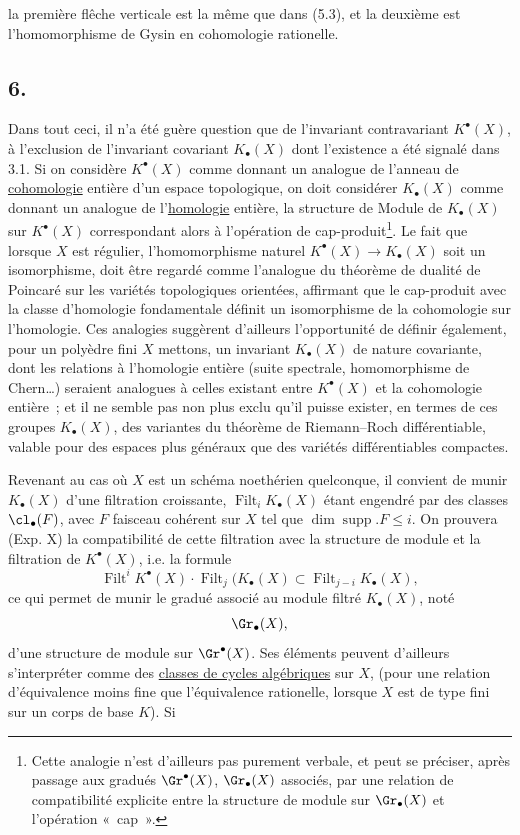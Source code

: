 la
premi\`ere fl\^eche verticale est la m\^eme que dans (5.3), et la deuxi\`eme est l'homomorphisme de Gysin en cohomologie rationelle.

\subsection*{6.}
Dans tout ceci, il n'a \'et\'e gu\`ere question que de l'invariant contravariant $K^\bullet(X)$, \`a l'exclusion de l'invariant covariant $K_\bullet(X)$ dont l'existence a \'et\'e signal\'e dans 3.1. Si on consid\`ere $K^\bullet(X)$ comme donnant un analogue de l'anneau de \underline{cohomologie} enti\`ere d'un espace topologique, on doit consid\'erer $K_\bullet(X)$ comme donnant un analogue de l'\underline{homologie} enti\`ere, la structure de Module de $K_\bullet(X)$ sur $K^\bullet(X)$ correspondant alors \`a l'op\'eration de cap-produit\footnote{Cette analogie n'est d'ailleurs pas purement verbale, et peut se pr\'eciser, apr\`es passage aux gradu\'es $\Gr^\bullet(X)$, $\Gr_\bullet(X)$ associ\'es, par une relation de compatibilit\'e explicite entre la structure de module sur $\Gr_\bullet(X)$ et l'op\'eration «~cap~».}. Le fait que lorsque $X$ est r\'egulier, l'homomorphisme naturel $K^\bullet(X)\to K_\bullet(X)$ soit un isomorphisme, doit \^etre regard\'e comme l'analogue du th\'eor\`eme de dualit\'e de Poincar\'e sur les vari\'et\'es topologiques orient\'ees, affirmant que le cap-produit avec la classe d'homologie fondamentale d\'efinit un isomorphisme de la cohomologie sur l'homologie. Ces analogies sugg\`erent d'ailleurs l'opportunit\'e de d\'efinir \'egalement, pour un poly\`edre fini $X$ mettons, un invariant $K_\bullet(X)$ de nature covariante, dont les relations \`a l'homologie enti\`ere (suite spectrale, homomorphisme de Chern\dots) seraient analogues \`a celles existant entre $K^\bullet(X)$ et la cohomologie enti\`ere~; et il ne semble pas non plus exclu qu'il puisse exister, en termes de ces groupes $K_\bullet(X)$, des variantes du th\'eor\`eme de Riemann--Roch diff\'erentiable, valable pour des espaces plus g\'en\'eraux que des vari\'et\'es diff\'erentiables compactes.

Revenant au cas o\`u $X$ est un sch\'ema noeth\'erien quelconque, il convient de munir $K_\bullet(X)$ d'une filtration croissante, $\operatorname{Filt}_iK_\bullet(X)$ \'etant engendr\'e par des classes $\cl_\bullet(F)$, avec $F$ faisceau coh\'erent sur $X$ tel que $\dim \operatorname{supp}.F\le i$. On prouvera (Exp. X) la compatibilit\'e de cette filtration avec la structure de module et la filtration de $K^\bullet(X)$, i.e. la formule
\begin{equation}\tag{6.1}
\operatorname{Filt}^iK^\bullet(X)\cdot \operatorname{Filt}_j(K_\bullet(X)\subset \operatorname{Filt}_{j-i}K_\bullet(X),
\end{equation}
ce qui permet de munir le gradu\'e associ\'e au module filtr\'e $K_\bullet(X)$, not\'e
\[
\Gr_\bullet(X),
\]
d'une structure de module sur $\Gr^\bullet(X)$. Ses \'el\'ements peuvent d'ailleurs s'interpr\'eter comme des \uline{classes de cycles alg\'ebriques} sur $X$, (pour une relation d'\'equivalence moins fine que l'\'equivalence rationelle, lorsque $X$ est de type fini sur un corps de base $K$). Si
